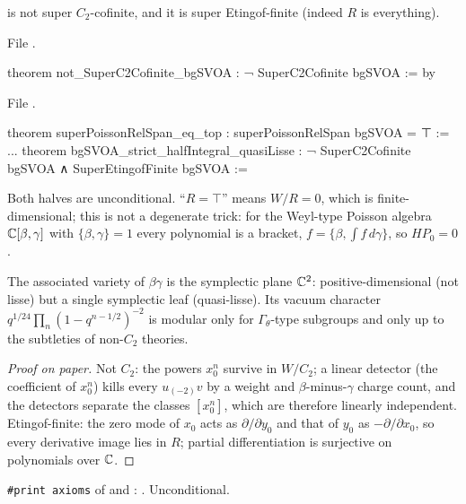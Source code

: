 \begin{theorem}\label{l17:thm:bgquasi}
 is not super $C_2$-cofinite, and it is super Etingof-finite (indeed $R$ is everything).
\end{theorem}
\noindent File .
\begin{leancode}
theorem not_SuperC2Cofinite_bgSVOA : ¬ SuperC2Cofinite bgSVOA := by
\end{leancode}
\noindent File .
\begin{leancode}
theorem superPoissonRelSpan_eq_top : superPoissonRelSpan bgSVOA = ⊤ :=
...
theorem bgSVOA_strict_halfIntegral_quasiLisse :
    ¬ SuperC2Cofinite bgSVOA ∧ SuperEtingofFinite bgSVOA :=
\end{leancode}
\begin{dictionary}
Both halves are unconditional. ``$R=\top$'' means $W/R=0$, which is finite-dimensional; this is not
a degenerate trick: for the Weyl-type Poisson algebra ${\mathbb{C}}[\beta,\gamma]$ with $\{\beta,\gamma\}=1$ every
polynomial is a bracket, $f=\{\beta,\int f\,d\gamma\}$, so $HP_0=0$.
\end{dictionary}
\begin{physics}
The associated variety of $\beta\gamma$ is the symplectic plane ${\mathbb{C}}^2$: positive-dimensional
(not lisse) but a single symplectic leaf (quasi-lisse). Its vacuum character
$q^{1/24}\prod_{n}(1-q^{n-1/2})^{-2}$ is modular only for $\Gamma_\theta$-type subgroups and only up
to the subtleties of non-$C_2$ theories.
\end{physics}
\begin{proof}[Proof on paper]
Not $C_2$: the powers $x_0^n$ survive in $W/C_2$; a linear detector (the coefficient of $x_0^n$) kills
every $u_{(-2)}v$ by a weight and $\beta$-minus-$\gamma$ charge count, and the detectors separate the
classes $[x_0^n]$, which are therefore linearly independent. Etingof-finite: the zero mode of $x_0$
acts as $\partial/\partial y_0$ and that of $y_0$ as $-\partial/\partial x_0$, so every derivative
image lies in $R$; partial differentiation is surjective on polynomials over ${\mathbb{C}}$.
\end{proof}
\begin{status}
\texttt{\#print axioms} of  and
: . Unconditional.
\end{status}


